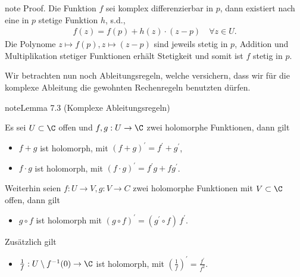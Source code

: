 \documentclass[letterpaper,10pt,german]{jupyterBook}
\begin{document}
\begin{sphinxadmonition}{note}
\sphinxAtStartPar
Proof. Die Funktion \(f\) sei komplex differenzierbar in \(p\), dann existiert nach {\hyperref[\detokenize{complexanalysis/cauchyriemann:lem:splitholo}]{}} eine in \(p\) stetige Funktion \(h\), s.d.,
\begin{equation*}
\begin{split}f(z) = f(p) + h(z)\cdot(z-p)\quad \forall z\in U.\end{split}
\end{equation*}
\sphinxAtStartPar
Die Polynome \(z\mapsto f(p), z\mapsto (z-p)\) sind jeweils stetig in \(p\), Addition und Multiplikation stetiger Funktionen erhält Stetigkeit und somit ist \(f\) stetig in \(p\).
\end{sphinxadmonition}

\sphinxAtStartPar
Wir betrachten nun noch Ableitungsregeln, welche versichern, dass wir für die komplexe Ableitung die gewohnten Rechenregeln benutzten dürfen.
\label{complexanalysis/cauchyriemann:lemma-4}
\begin{sphinxadmonition}{note}{Lemma 7.3 (Komplexe Ableitungsregeln)}



\sphinxAtStartPar
Es sei \(U\subset\C\) offen und \(f,g:U\to\C\) zwei holomorphe Funktionen, dann gilt
\begin{itemize}
\item {} 
\sphinxAtStartPar
\(f+g\) ist holomorph, mit \((f+g)^\prime = f^\prime + g^\prime\),

\item {} 
\sphinxAtStartPar
\(f\cdot g\) ist holomorph, mit \((f\cdot g)^\prime = f^\prime g+ f g^\prime\).

\end{itemize}

\sphinxAtStartPar
Weiterhin seien \(f:U\to V, g:V\to C\) zwei holomorphe Funktionen mit \(V\subset\C\) offen, dann gilt
\begin{itemize}
\item {} 
\sphinxAtStartPar
\(g\circ f\) ist holomorph mit \((g\circ f)^\prime = (g^\prime \circ f)\, f^\prime\).

\end{itemize}

\sphinxAtStartPar
Zusätzlich gilt
\begin{itemize}
\item {} 
\sphinxAtStartPar
\(\frac{1}{f}: U\setminus f^{-1}(0)\to \C\) ist holomorph, mit \((\frac{1}{f})^\prime = \frac{f^\prime}{f^2}\).

\end{itemize}
\end{sphinxadmonition}
\end{document}
